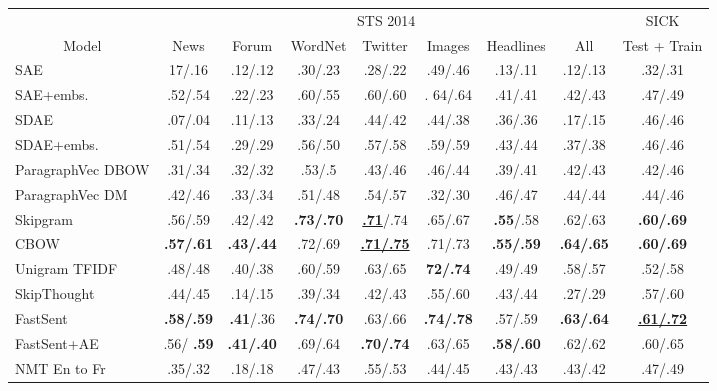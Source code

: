 \documentclass[11pt,letterpaper]{article}
\begin{document}
\begin{table*}[ht]
\begin{center}
      {
        \begin{tabular}{l|cccccc|c|c}
          & \multicolumn{7}{c|}{STS 2014} & SICK \\
           \multicolumn{1}{c|}{Model} & News & Forum & WordNet & Twitter & Images & Headlines & All  & \multicolumn{1}{c}{Test + Train}  \\
          \hline
\hline
    SAE & 17/.16 & .12/.12 & 	.30/.23 & 	.28/.22 & 	.49/.46 & 	.13/.11 & 	.12/.13 & .32/.31 \\
          SAE+embs. & .52/.54 & .22/.23 &  .60/.55 &  .60/.60 & . 64/.64 & .41/.41 & .42/.43 & .47/.49\\
 SDAE & .07/.04 &  .11/.13& .33/.24 & .44/.42 & .44/.38 & .36/.36 & .17/.15 & .46/.46 \\
 SDAE+embs.  & .51/.54 & .29/.29	& .56/.50	& .57/.58	& .59/.59	& .43/.44	& .37/.38 & .46/.46 \\
          ParagraphVec DBOW & .31/.34 & .32/.32 & .53/.5 & .43/.46 & .46/.44 & .39/.41 & .42/.43 & .42/.46\\
          ParagraphVec DM & .42/.46 & .33/.34 & .51/.48 & .54/.57 & .32/.30 &  .46/.47 &  .44/.44 & .44/.46 \\
                  Skipgram &.56/.59&	.42/.42& \bf	.73/.70& \underline{\bf .71}/.74&	.65/.67& {\bf	.55}/.58&	.62/.63 & \bf .60/.69 \\
          CBOW & \bf .57/.61 & \bf	.43/.44	& .72/.69	&\underline{\bf .71/.75}&.71/.73& \bf	.55/.59&	\bf .64/.65 & \bf .60/.69 \\
Unigram TFIDF & .48/.48 & .40/.38 & .60/.59  & .63/.65 & \bf 72/.74 &.49/.49	&.58/.57 & .52/.58 \\
          \hline 
           SkipThought & .44/.45 & .14/.15 & .39/.34 & .42/.43 & .55/.60 & .43/.44 & .27/.29 & .57/.60\\
FastSent &  {\bf .58/.59} & {\bf .41}/.36 & \bf .74/.70 & .63/.66 &  \bf{.74/.78} & .57/.59 &  \bf .63/.64 & \underline{\bf .61/.72}\\
FastSent+AE & .56/ \bf{.59} & \bf{.41/.40} &  .69/.64 & \bf .70/.74 & .63/.65 &  \bf{.58/.60} &  .62/.62 & .60/.65 \\
          \hline 
          NMT En to Fr & .35/.32	& .18/.18	& .47/.43 & .55/.53	& .44/.45	& .43/.43 & .43/.42 & .47/.49 \\



\end{tabular}}
\end{center}
\end{table*}
\end{document}
